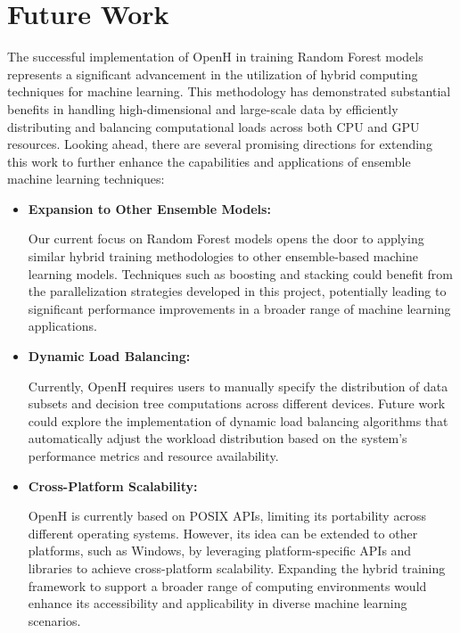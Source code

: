 \documentclass[11.5pt]{article}
\begin{document}
\section{Future Work}
The successful implementation of OpenH in training Random Forest models represents a significant advancement in the utilization of hybrid computing techniques for machine learning. This methodology has demonstrated substantial benefits in handling high-dimensional and large-scale data by efficiently distributing and balancing computational loads across both CPU and GPU resources. Looking ahead, there are several promising directions for extending this work to further enhance the capabilities and applications of ensemble machine learning techniques:
\begin{itemize}
    \item \textbf{Expansion to Other Ensemble Models:}
    
    Our current focus on Random Forest models opens the door to applying similar hybrid training methodologies to other ensemble-based machine learning models. 
    Techniques such as boosting and stacking could benefit from the parallelization strategies developed in this project, potentially leading to significant performance improvements in a broader range of machine learning applications.

    \item \textbf{Dynamic Load Balancing:}
    
    Currently, OpenH requires users to manually specify the distribution of data subsets and decision tree computations across different devices. 
    Future work could explore the implementation of dynamic load balancing algorithms that automatically adjust the workload distribution based on the system's performance metrics and resource availability.

    \item \textbf{Cross-Platform Scalability:}
    
    OpenH is currently based on POSIX APIs, limiting its portability across different operating systems.
    However, its idea can be extended to other platforms, such as Windows, by leveraging platform-specific APIs and libraries to achieve cross-platform scalability.
    Expanding the hybrid training framework to support a broader range of computing environments would enhance its accessibility and applicability in diverse machine learning scenarios.
\end{itemize}
\end{document}
